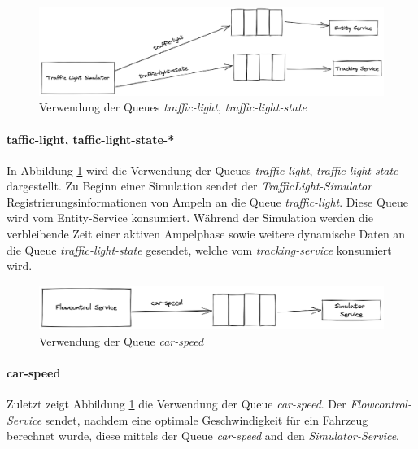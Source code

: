 \begin{figure}[h]
	\centering
	\includegraphics[width=1\textwidth]{./figures/traffic-light_simulator_mom.png}
	\caption{Verwendung der Queues \textit{traffic-light}, \textit{traffic-light-state} }
	\label{fig:light_simulator_mom}
\end{figure}

\paragraph{taffic-light, taffic-light-state-*}

In Abbildung \ref{fig:light_simulator_mom} wird die Verwendung der Queues \textit{traffic-light}, \textit{traffic-light-state} dargestellt.
Zu Beginn einer Simulation sendet der \textit{TrafficLight-Simulator} Registrierungsinformationen von Ampeln an die Queue \textit{traffic-light}.
Diese Queue wird vom Entity-Service konsumiert.
Während der Simulation werden die verbleibende Zeit einer aktiven Ampelphase sowie weitere dynamische Daten an die Queue \textit{traffic-light-state} gesendet, welche vom \textit{tracking-service} konsumiert wird.

\begin{figure}[h]
	\centering
	\includegraphics[width=1\textwidth]{./figures/flowcontrol_speed_mom.png}
	\caption{Verwendung der Queue \textit{car-speed}}
	\label{fig:car_speed_mom}
\end{figure}

\paragraph{car-speed}

Zuletzt zeigt Abbildung \ref{fig:light_simulator_mom} die Verwendung der Queue \textit{car-speed}.
Der \textit{Flowcontrol-Service} sendet, nachdem eine optimale Geschwindigkeit für ein Fahrzeug berechnet wurde, diese mittels der Queue \textit{car-speed} and den \textit{Simulator-Service}.
